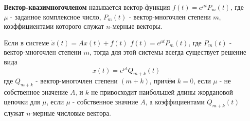 \begin{definition}
  \textbf{Вектор-квазимногочленом} называется вектор-функция $f(t) = e^{\mu t} P_m(t)$, где $\mu$ - заданное комплексное число, $P_m(t)$ - вектор-многочлен степени $m$, коэффициентами которого служат $n$-мерные векторы. 
\end{definition}

\begin{theorem}
  Если в системе $\dot{x}(t) = A x(t) + f(t)$ $f(t) = e^{\mu t} P_m(t)$, где $P_m(t)$ - вектор-многочлен степени $m$, тогда для этой системы всегда существует решение вида
  \[ x(t) = e^{\mu t} Q_{m+k}(t)\]
  где $Q_{m + k}$ - вектор-многочлен степени $(m + k)$, причём $k = 0$, если $\mu$ - не собственное значение $A$, и $k$ не привосходит наибольшей длины жордановой цепочки для $\mu$, если $\mu$ - собственное значние $A$, а коэффициентами $Q_{m+k}(t)$ служат $n$-мерные числовые вектора.
\end{theorem}